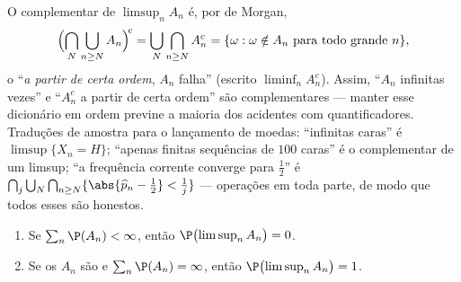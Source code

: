 \begin{example}\label{ex:b2:proba:limsuplang}
O complementar de $\limsup_nA_n$ é, por de Morgan,
\[
\Bigl(\bigcap_N\bigcup_{n\geq N}A_n\Bigr)^{\!c}
= \bigcup_N\bigcap_{n\geq N}A_n^c
= \{\omega : \omega \notin A_n \text{ para todo grande }n\},
\]
o  ``\emph{a partir de certa ordem}, $A_n$ falha'' (escrito
$\liminf_nA_n^c$). Assim, ``$A_n$ infinitas vezes'' e
``$A_n^c$ a partir de certa ordem'' são complementares --- manter esse
dicionário em ordem previne a maioria dos acidentes com quantificadores.
Traduções de amostra para o lançamento de moedas: ``infinitas
caras'' é $\limsup\{X_n = H\}$; ``apenas finitas sequências
de $100$ caras'' é o complementar de um limsup; ``a
frequência corrente converge para $\frac12$'' é
$\bigcap_j\bigcup_N\bigcap_{n\geq N}\{\abs{\widehat p_n -
\tfrac12} < \tfrac1j\}$ --- operações  em toda parte,
de modo que todos esses são  honestos.
\end{example}

\begin{theorem}\label{thm:b2:proba:borelcantelli}
\leavevmode
\begin{enumerate}
\item Se $\sum_{n} \P(A_n) < \infty$, então
$\P\bigl(\limsup_n A_n\bigr) = 0$.
\item Se os  $A_n$ são  e $\sum_n \P(A_n) =
\infty$, então $\P\bigl(\limsup_n A_n\bigr) = 1$.
\end{enumerate}
\end{theorem}

